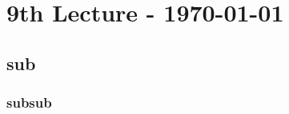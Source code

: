 \documentclass{article}
\begin{document}
	\newpage
	
	\section{9th Lecture - \today}
	\begin{adjustwidth}{2em}{2em}
		\subsection{sub}
		\begin{adjustwidth}{2em}{2em}
			\subsubsection{subsub}
			\begin{adjustwidth}{2em}{}
			\end{adjustwidth}
		\end{adjustwidth}
	\end{adjustwidth}
\end{document}

